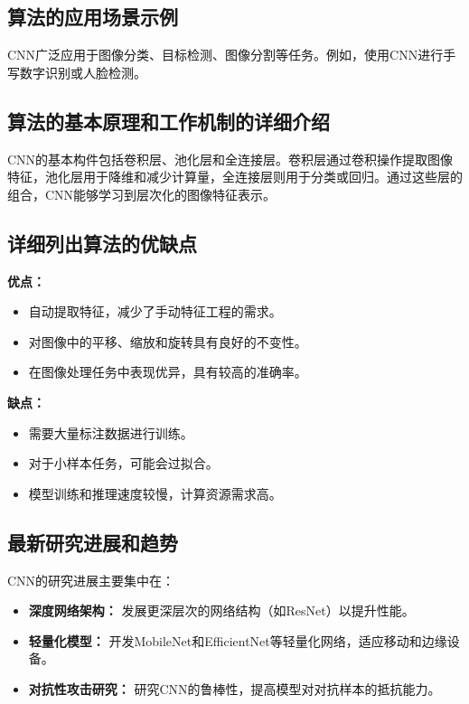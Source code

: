 \subsection*{算法的应用场景示例}
CNN广泛应用于图像分类、目标检测、图像分割等任务。例如，使用CNN进行手写数字识别或人脸检测。

\subsection*{算法的基本原理和工作机制的详细介绍}
CNN的基本构件包括卷积层、池化层和全连接层。卷积层通过卷积操作提取图像特征，池化层用于降维和减少计算量，全连接层则用于分类或回归。通过这些层的组合，CNN能够学习到层次化的图像特征表示。

\subsection*{详细列出算法的优缺点}
\textbf{优点：}
\begin{itemize}
    \item 自动提取特征，减少了手动特征工程的需求。
    \item 对图像中的平移、缩放和旋转具有良好的不变性。
    \item 在图像处理任务中表现优异，具有较高的准确率。
\end{itemize}

\textbf{缺点：}
\begin{itemize}
    \item 需要大量标注数据进行训练。
    \item 对于小样本任务，可能会过拟合。
    \item 模型训练和推理速度较慢，计算资源需求高。
\end{itemize}

\subsection*{最新研究进展和趋势}
CNN的研究进展主要集中在：
\begin{itemize}
    \item \textbf{深度网络架构：} 发展更深层次的网络结构（如ResNet）以提升性能。
    \item \textbf{轻量化模型：} 开发MobileNet和EfficientNet等轻量化网络，适应移动和边缘设备。
    \item \textbf{对抗性攻击研究：} 研究CNN的鲁棒性，提高模型对对抗样本的抵抗能力。
\end{itemize}
